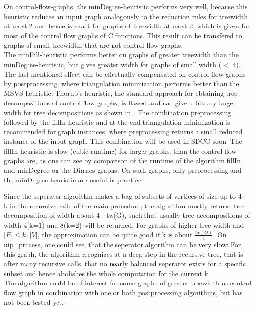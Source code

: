 \documentclass[a4wide]{article}
\begin{document}
On control-flow-graphs, the minDegree-heuristic performs very well, because this heuristic reduces an input graph analogously to the reduction rules for treewidth at most 2 and hence is exact for graphs of treewidth at most 2, which is given for most of the control flow graphs of C functions. This result can be transfered to graphs of small treewidth, that are not control flow graphs. \\
The minFill-heuristic performs better on graphs of greater treewidth than the minDegree-heuristic, but gives greater width for graphs of small width ($<$ 4). The last mentioned effect can be effectually compensated on control flow graphs by postprocessing, where triangulation minimization performs better than the MSVS-heuristic.
Thorup's heuristic, the standard approach for obtaining tree decompositions of control flow graphs, is flawed and can give arbitrary large width for tree decompositions as shown in \cite{C-tree}. 
The combination preprocessing followed by the fillIn heuristic and at the end triangulation minimization is recommended for graph instances, where preprocessing returns a small reduced instance of the input graph. This combination will be used in SDCC soon. The fillIn heuristic is slow (cubic runtime) for larger graphs, than the control flow graphs are, as one can see by comparison of the runtime of the algorithm fillIn and minDegree on the Dimacs graphs. On such graphs, only preprocessing and the minDegree heuristic are useful in practice.   

Since the seperator algorithm makes a bag of subsets of vertices of size up to 4 $\cdot$ k in the recursive calls of the main procedure, the algorithm mostly returns tree decomposition of width about 4 $\cdot$ tw(G), such that usually tree decompositions of width 4(k=1) and 8(k=2) will be returned. For graphs of higher tree width and $|E| \leq k \cdot |V|$, the approximation can be quite good if k is about $\frac {tw(G)}{4}$. On uip\_process, one could see, that the seperator algorithm can be very slow: For this graph, the algorithm recognizes at a deep step in the recursive tree, that is after many recursive calls, that no nearly balanced seperator exists for a specific subset and hence abolishes the whole computation for the current k. \\ 
The algorithm could be of interest for some graphs of greater treewidth as control flow graph in combination with one or both postprocessing algorithms, but has not been tested yet. \\

\newpage


 
\end{document}
